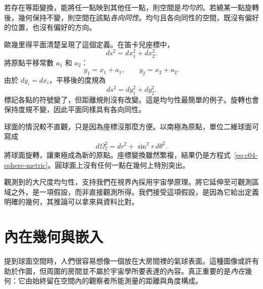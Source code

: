 \begin{definition}
若存在等距變換，能將任一點映到其他任一點，則空間是\emph{均勻的}。若繞某一點旋轉後，幾何保持不變，則空間在該點\emph{各向同性}。均勻且各向同性的空間，既沒有偏好的位置，也沒有偏好的方向。
\end{definition}

歐幾里得平面清楚呈現了這個定義。在笛卡兒座標中，
\begin{equation}
ds^2=dx_1^2+dx_2^2.
\label{eq:c04-flat-metric}
\end{equation}
將原點平移常數 \(a_1\) 和 \(a_2\)：
\begin{equation}
y_1=x_1+a_1,
\qquad
y_2=x_2+a_2.
\label{eq:c04-flat-translation}
\end{equation}
由於 \(dy_i=dx_i\)，平移後的度規為
\begin{equation}
ds^2=dy_1^2+dy_2^2.
\end{equation}
標記各點的符號變了，但距離規則沒有改變。這是均勻性最簡單的例子。旋轉也會保持度規不變，因此平面同樣具有各向同性。

球面的情況較不直觀，只是因為座標沒那麼方便。以南極為原點，單位二維球面可寫成
\begin{equation}
d\Omega_2^2=dr^2+\sin^2 r\,d\theta^2.
\label{eq:c04-sphere-metric}
\end{equation}
將球面旋轉，讓東極成為新的原點。座標變換雖然繁複，結果仍是方程式~\eqref{eq:c04-sphere-metric}。圓球面上沒有任何一點在幾何上特別突出。

\begin{classroomqa}
\end{classroomqa}

觀測到的大尺度均勻性，支持我們在視界內採用宇宙學原理。將它延伸至可觀測區域之外，是一項假設，而非直接觀測所得。我們接受這項假設，是因為它給出定義明確的幾何，其推論可以拿來與資料比對。

\section{內在幾何與嵌入}

提到球面空間時，人們很容易想像一個放在大房間裡的氣球表面。這種圖像或許有助於作圖，但周圍的房間並不屬於宇宙學所要表達的內容。真正重要的是\emph{內在}幾何：它由始終留在空間內的觀察者所能測量的距離與角度構成。

